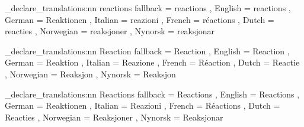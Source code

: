 \chemmacros_declare_translations:nn {reactions}
  {
    fallback  = reactions ,
    English   = reactions ,
    German    = Reaktionen ,
    Italian   = reazioni ,
    French    = r\'{e}actions ,
    Dutch     = reacties ,
    Norwegian = reaksjoner ,
    Nynorsk   = reaksjonar
  }

\chemmacros_declare_translations:nn {Reaction}
  {
    fallback  = Reaction ,
    English   = Reaction ,
    German    = Reaktion ,
    Italian   = Reazione ,
    French    = R\'{e}action ,
    Dutch     = Reactie ,
    Norwegian = Reaksjon ,
    Nynorsk   = Reaksjon
  }

\chemmacros_declare_translations:nn {Reactions}
  {
    fallback = Reactions ,
    English  = Reactions ,
    German   = Reaktionen ,
    Italian  = Reazioni ,
    French   = R\'{e}actions ,
    Dutch    = Reacties ,
    Norwegian = Reaksjoner ,
    Nynorsk   = Reaksjonar
 }

\ChemModuleEnd
